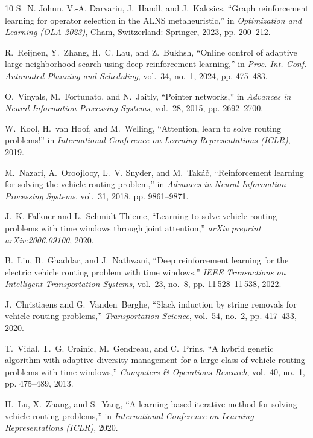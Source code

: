 \documentclass{ieeeaccess}
\begin{document}
{\begin{thebibliography}{10}
S.~N. Johnn, V.-A. Darvariu, J.~Handl, and J.~Kalcsics, ``Graph reinforcement learning for operator selection in the {ALNS} metaheuristic,'' in \emph{Optimization and Learning (OLA 2023)}, Cham, Switzerland: Springer, 2023, pp. 200--212.

R.~Reijnen, Y.~Zhang, H.~C. Lau, and Z.~Bukhsh, ``Online control of adaptive large neighborhood search using deep reinforcement learning,'' in \emph{Proc. Int. Conf. Automated Planning and Scheduling}, vol.~34, no.~1, 2024, pp. 475--483.

O.~Vinyals, M.~Fortunato, and N.~Jaitly, ``Pointer networks,'' in \emph{Advances in Neural Information Processing Systems}, vol.~28, 2015, pp. 2692--2700.

W.~Kool, H.~van Hoof, and M.~Welling, ``Attention, learn to solve routing problems!'' in \emph{International Conference on Learning Representations (ICLR)}, 2019.

M.~Nazari, A.~Oroojlooy, L.~V. Snyder, and M.~Tak{\'a}{\v{c}}, ``Reinforcement learning for solving the vehicle routing problem,'' in \emph{Advances in Neural Information Processing Systems}, vol.~31, 2018, pp. 9861--9871.

J.~K. Falkner and L.~Schmidt-Thieme, ``Learning to solve vehicle routing problems with time windows through joint attention,'' \emph{arXiv preprint arXiv:2006.09100}, 2020.

B.~Lin, B.~Ghaddar, and J.~Nathwani, ``Deep reinforcement learning for the electric vehicle routing problem with time windows,'' \emph{IEEE Transactions on Intelligent Transportation Systems}, vol.~23, no.~8, pp. 11\,528--11\,538, 2022.

J.~Christiaens and G.~Vanden~Berghe, ``Slack induction by string removals for vehicle routing problems,'' \emph{Transportation Science}, vol.~54, no.~2, pp. 417--433, 2020.

T.~Vidal, T.~G. Crainic, M.~Gendreau, and C.~Prins, ``A hybrid genetic algorithm with adaptive diversity management for a large class of vehicle routing problems with time-windows,'' \emph{Computers \& Operations Research}, vol.~40, no.~1, pp. 475--489, 2013.

H.~Lu, X.~Zhang, and S.~Yang, ``A learning-based iterative method for solving vehicle routing problems,'' in \emph{International Conference on Learning Representations (ICLR)}, 2020.


\end{thebibliography}}
\end{document}
